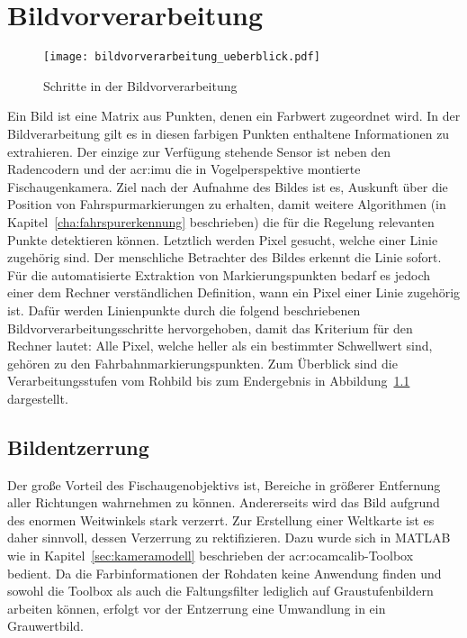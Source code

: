 \chapter{Bildvorverarbeitung \dcfirstauthorshort}
\label{cha:bildvorverarbeitung}

\begin{figure}[htbp] %
	\centering
	\texttt{[image: bildvorverarbeitung\_ueberblick.pdf]}
	\caption{Schritte in der Bildvorverarbeitung}
	\label{fig:bildvorverarbeitung_ueberblick}
\end{figure} 

Ein Bild ist eine Matrix aus Punkten, denen ein Farbwert zugeordnet wird. In der Bildverarbeitung gilt es in diesen farbigen Punkten enthaltene Informationen zu extrahieren. Der einzige zur Verfügung stehende Sensor ist neben den Radencodern und der \gls{acr:imu} die in Vogelperspektive montierte Fischaugenkamera. Ziel nach der Aufnahme des Bildes ist es, Auskunft über die Position von Fahrspurmarkierungen zu erhalten, damit weitere Algorithmen (in Kapitel~\ref{cha:fahrspurerkennung} beschrieben) die für die Regelung relevanten Punkte detektieren können. Letztlich werden Pixel gesucht, welche einer Linie zugehörig sind. Der menschliche Betrachter des Bildes erkennt die Linie sofort. Für die automatisierte Extraktion von Markierungspunkten bedarf es jedoch einer dem Rechner verständlichen Definition, wann ein Pixel einer Linie zugehörig ist. Dafür werden Linienpunkte durch die folgend beschriebenen Bildvorverarbeitungsschritte hervorgehoben, damit das Kriterium für den Rechner lautet: Alle Pixel, welche heller als ein bestimmter Schwellwert sind, gehören zu den Fahrbahnmarkierungspunkten. Zum Überblick sind die Verarbeitungsstufen vom Rohbild bis zum Endergebnis in Abbildung~\ref{fig:bildvorverarbeitung_ueberblick} dargestellt.

\section{Bildentzerrung \dcfirstauthorshort}

Der große Vorteil des Fischaugenobjektivs ist, Bereiche in größerer Entfernung aller Richtungen wahrnehmen zu können. Andererseits wird das Bild aufgrund des enormen Weitwinkels stark verzerrt. Zur Erstellung einer Weltkarte ist es daher sinnvoll, dessen Verzerrung zu rektifizieren. Dazu wurde sich in MATLAB wie in Kapitel~\ref{sec:kameramodell} beschrieben der \gls{acr:ocamcalib}-Toolbox bedient. Da die Farbinformationen der Rohdaten keine Anwendung finden und sowohl die Toolbox als auch die Faltungsfilter lediglich auf Graustufenbildern arbeiten können, erfolgt vor der Entzerrung eine Umwandlung in ein Grauwertbild.

